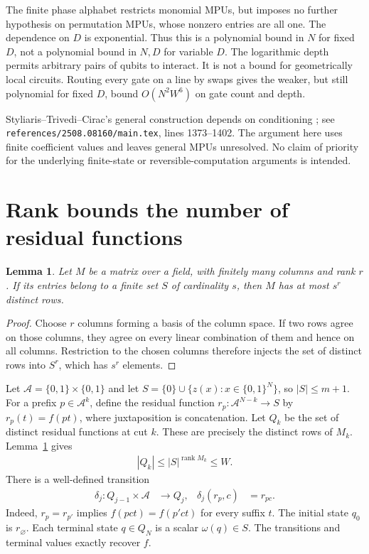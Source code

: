 \documentclass[11pt]{article}
\newtheorem{lemma}[theorem]{Lemma}
\begin{document}
The finite phase alphabet restricts monomial MPUs, but imposes no further
hypothesis on permutation MPUs, whose nonzero entries are all one.
The dependence on $D$ is exponential. Thus this is a polynomial bound in
$N$ for fixed $D$, not a polynomial bound in $N,D$ for variable $D$.
The logarithmic depth permits arbitrary pairs of qubits to interact. It is
not a bound for geometrically local circuits. Routing every gate on a line
by swaps gives the weaker, but still polynomial for fixed $D$, bound
$O(N^2W^6)$ on gate count and depth.

Styliaris--Trivedi--Cirac's general construction depends on conditioning
\cite{STC25}; see \nolinkurl{references/2508.08160/main.tex}, lines 1373--1402.
The argument here uses finite coefficient values and leaves general MPUs
unresolved. No claim of priority for the underlying finite-state or
reversible-computation arguments is intended.

\section{Rank bounds the number of residual functions}

\begin{lemma}\label{lem:rows}
Let $M$ be a matrix over a field, with finitely many columns and rank $r$.
If its entries belong to a finite set $S$ of cardinality $s$, then $M$ has
at most $s^r$ distinct rows.
\end{lemma}

\begin{proof}
Choose $r$ columns forming a basis of the column space. If two rows agree
on those columns, they agree on every linear combination of them and hence
on all columns. Restriction to the chosen columns therefore injects the
set of distinct rows into $S^r$, which has $s^r$ elements.
\end{proof}

Let $\mathcal A=\{0,1\}\times\{0,1\}$ and let
$S=\{0\}\cup\{z(x):x\in\{0,1\}^N\}$, so $|S|\leq m+1$.
For a prefix $p\in\mathcal A^k$, define the residual function
$r_p:\mathcal A^{N-k}\to S$ by $r_p(t)=f(pt)$, where juxtaposition is
concatenation. Let $Q_k$ be the set of distinct residual functions at cut
$k$. These are precisely the distinct rows of $M_k$. Lemma~\ref{lem:rows}
gives
\begin{align}
 |Q_k|\leq |S|^{\operatorname{rank}M_k}\leq W.
 \label{eq:width}
\end{align}
There is a well-defined transition
\begin{align}
 \delta_j:Q_{j-1}\times\mathcal A&\longrightarrow Q_j,&
 \delta_j(r_p,c)&=r_{pc}.
 \label{eq:transition}
\end{align}
Indeed, $r_p=r_{p'}$ implies $f(pct)=f(p'ct)$ for every suffix $t$.
The initial state $q_0$ is $r_{\varnothing}$.
Each terminal state $q\in Q_N$ is a scalar $\omega(q)\in S$.
The transitions and terminal values exactly recover $f$.
\end{document}

